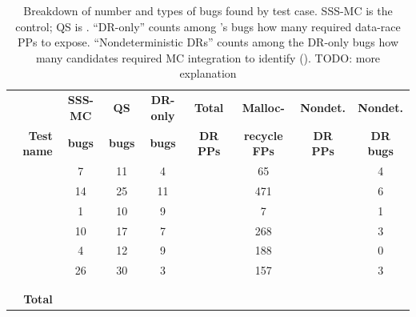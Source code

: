 
\begin{table}[t]
	\begin{center}
	\begin{tabular}{r||c|c|c||c|c|c|c}
		& {\bf SSS-MC} & {\bf QS} & {\bf DR-only} & {\bf Total} & {\bf Malloc-} & {\bf Nondet.} & {\bf Nondet.} \\
		{\bf Test name} & {\bf bugs} & {\bf bugs} & {\bf bugs} & {\bf DR PPs} & {\bf recycle FPs} & {\bf DR PPs} & {\bf DR bugs} \\
		\hline
		{\bct		} & 7	& 11	& 4	&	& 65	&	& 4	\\
		{\tej		} & 14 	& 25	& 11	&	& 471	&	& 6	\\
		{\mxtest	} & 1	& 10	& 9	&	& 7	&	& 1	\\
		{\paradise	} & 10	& 17	& 7	&	& 268	&	& 3	\\
		{\paraguay	} & 4	& 12	& 9	&	& 188	&	& 0	\\
		{\rwl		} & 26	& 30	& 3	&	& 157	&	& 3	\\
		\hline
		{\prisema	} &	&	&	&	&	&	&	\\
		{\waitsimple	} &	&	&	&	&	&	&	\\
		\hline
		{\bf Total}	&	&	&	&	&	&	&
	\end{tabular}
	\end{center}
	\caption{Breakdown of number and types of bugs found by test case.
		SSS-MC is the control; QS is \quicksand.
		``DR-only'' counts among \quicksand's bugs how many required data-race PPs to expose.
	``Nondeterministic DRs'' counts among the DR-only bugs how many candidates required MC integration to identify (\sect{\ref{sec:eval-falseneg}}).
		TODO: more explanation}
	\label{tab:drbugs}
\end{table}

